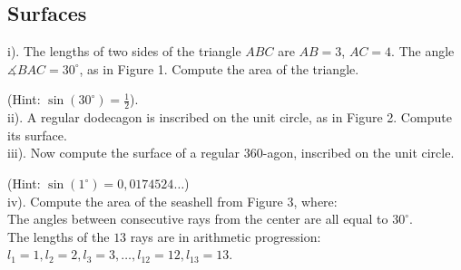  
\begin{multicols}{2}
\section*{Surfaces}

i). The lengths of two sides of the triangle $ABC$ are $AB=3$, $AC=4$. The angle $\measuredangle BAC=30^{\circ}$, as in Figure 1. Compute the area of the triangle. 

(Hint: $\sin(30^{\circ})=\frac{1}{2}$).\\

ii). A regular dodecagon is inscribed on the unit circle, as in Figure 2. Compute its surface.\\

iii). Now compute the surface of a regular $360$-agon, inscribed on the unit circle. 

(Hint: $\sin(1^{\circ})=0,0174524\dots$)\\

iv). Compute the area of the seashell from Figure 3, where:\\

The angles between consecutive rays from the center are all equal to $30^{\circ}$.\\

The lengths of the $13$ rays are in arithmetic progression: \\

$l_1=1, l_2=2, l_3=3, \dots, l_{12}=12, l_{13}=13$. 




\end{multicols}

